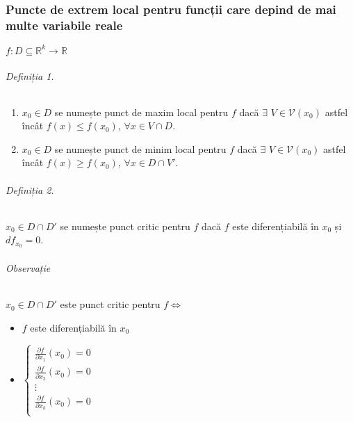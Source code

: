 \part{}
\section{Puncte de extrem local pentru funcții care depind de mai multe variabile reale}
$f:D \subseteq \mathbb{R}^{k} \rightarrow \mathbb{R}$

\paragraph{Definiția 1.}
\begin{enumerate}[label=\emph{\alph*})]
    \item $x_{0} \in D$ se numește punct de maxim local pentru $f$ dacă $\exists$ $V \in \mathcal{V}(x_{0})$ astfel încât
        $f(x) \leq f(x_{0})$, $\forall x \in V \cap D$.
    \item $x_{0} \in D$ se numește punct de minim local pentru $f$ dacă $\exists$ $V \in \mathcal{V}(x_{0})$ astfel încât
        $f(x) \geq f(x_{0})$, $\forall x \in D \cap V'$.
\end{enumerate}

\paragraph{Definiția 2.}
$x_{0} \in D \cap D'$ se numește punct critic pentru $f$ dacă $f$ este diferențiabilă în $x_{0}$ și $df_{x_{0}}=0$.

\paragraph{Observație}
$x_{0} \in D \cap D'$ este punct critic pentru $f \Leftrightarrow $
\begin{itemize}
    \item $f$ este diferențiabilă în $x_{0}$
    \item $\left\{
        \begin{array}{rl}
            \displaystyle\frac{\partial f}{\partial x_{1}}(x_{0})=0 \\
            \displaystyle\frac{\partial f}{\partial x_{2}}(x_{0})=0 \\
            \vdots \\
            \displaystyle\frac{\partial f}{\partial x_{k}}(x_{0})=0 \\
        \end{array}
        \right.$
\end{itemize}

